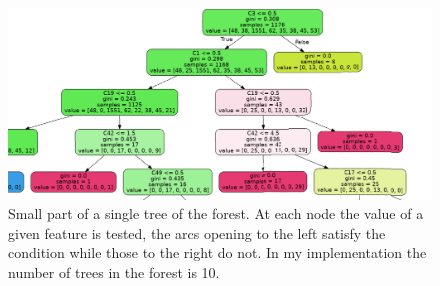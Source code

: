 \begin{figure}[!h]
 \centering
 \includegraphics[scale=0.4]{images/tree}
 \caption{\small{Small part of a single tree of the forest. At each node the value of a given feature is tested, the arcs opening to the left satisfy the condition while those to the right do not. In my implementation the number of trees in the forest is 10.}}
 \label{fig:tree}
\end{figure}


